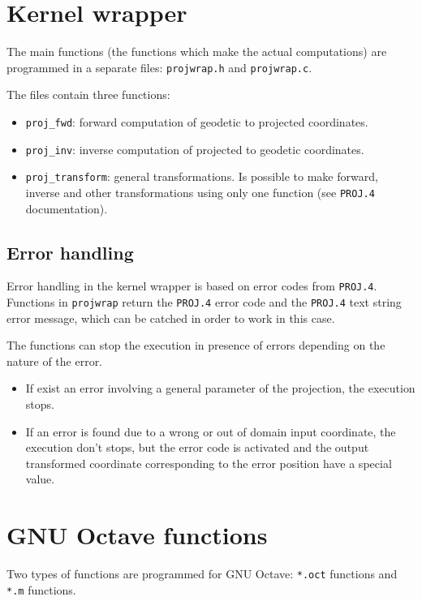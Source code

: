 \documentclass[10pt,a4paper]{article}
\newcommand{\proj}{\texttt{PROJ.4}}
\newcommand{\octave}{GNU Octave}
\begin{document}
\section{Kernel wrapper}
\label{op-kw}

The main functions (the functions which make the actual computations) are
programmed in a separate files: \texttt{projwrap.h} and \texttt{projwrap.c}.

The files contain three functions:
\begin{itemize}
\item \texttt{proj\_fwd}: forward computation of geodetic to projected
      coordinates.
\item \texttt{proj\_inv}: inverse computation of projected to geodetic
      coordinates.
\item \texttt{proj\_transform}: general transformations. Is possible to make
      forward, inverse and other transformations using only one function (see
      \proj{} documentation).
\end{itemize}

\subsection{Error handling}

Error handling in the kernel wrapper is based on error codes from \proj.
Functions in \texttt{projwrap} return the \proj{} error code and the \proj{}
text string error message, which can be catched in order to work in this case.

The functions can stop the execution in presence of errors depending on the
nature of the error.
\begin{itemize}
\item If exist an error involving a general parameter of the projection, the
      execution stops.
\item If an error is found due to a wrong or out of domain input coordinate, the
      execution don't stops, but the error code is activated and the output
      transformed coordinate corresponding to the error position have a special
      value.
\end{itemize}

\section{\octave{} functions}

Two types of functions are programmed for \octave: \texttt{*.oct} functions and
\texttt{*.m} functions.
\end{document}
